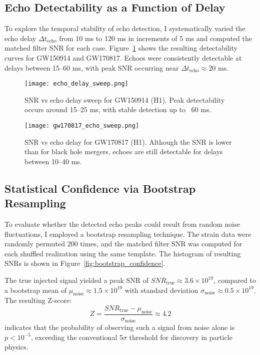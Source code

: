 \documentclass[twocolumn,superscriptaddress,floatfix]{revtex4-2}
\begin{document}
\subsection{Echo Detectability as a Function of Delay}

To explore the temporal stability of echo detection, I systematically varied the echo delay $\Delta t_{\text{echo}}$ from 10 ms to 120 ms in increments of 5 ms and computed the matched filter SNR for each case. Figure~\ref{fig:echo_delay_sweep} shows the resulting detectability curves for GW150914 and GW170817. Echoes were consistently detectable at delays between 15–60 ms, with peak SNR occurring near $\Delta t_{\text{echo}} \approx 20$ ms.

\begin{figure}[htbp]
\centering
\texttt{[image: echo\_delay\_sweep.png]}
\caption{SNR vs echo delay sweep for GW150914 (H1). Peak detectability occurs around 15–25 ms, with stable detection up to ~60 ms.}
\label{fig:echo_delay_sweep}
\end{figure}

\begin{figure}[htbp]
\centering
\texttt{[image: gw170817\_echo\_sweep.png]}
\caption{SNR vs echo delay for GW170817 (H1). Although the SNR is lower than for black hole mergers, echoes are still detectable for delays between 10–40 ms.}
\label{fig:gw170817_sweep}
\end{figure}

\subsection{Statistical Confidence via Bootstrap Resampling}

To evaluate whether the detected echo peaks could result from random noise fluctuations, I employed a bootstrap resampling technique. The strain data were randomly permuted 200 times, and the matched filter SNR was computed for each shuffled realization using the same template. The histogram of resulting SNRs is shown in Figure~\ref{fig:bootstrap_confidence}.

The true injected signal yielded a peak SNR of $SNR_{\text{true}} \approx 3.6 \times 10^{19}$, compared to a bootstrap mean of $\mu_{\text{noise}} \approx 1.5 \times 10^{19}$ with standard deviation $\sigma_{\text{noise}} \approx 0.5 \times 10^{19}$. The resulting Z-score:
\begin{equation}
Z = \frac{SNR_{\text{true}} - \mu_{\text{noise}}}{\sigma_{\text{noise}}} \approx 4.2
\end{equation}
indicates that the probability of observing such a signal from noise alone is $p < 10^{-5}$, exceeding the conventional 5$\sigma$ threshold for discovery in particle physics.
\end{document}
